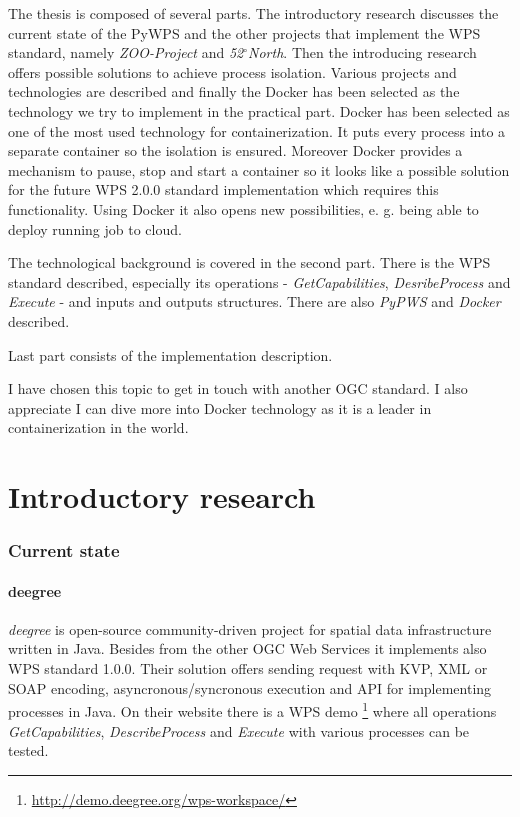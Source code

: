 \documentclass[12pt,a4paper]{article}
\begin{document}
The thesis is composed of several parts. The introductory research discusses the current state of the PyWPS and the
other projects that implement the WPS standard, namely \textit{ZOO-Project} and \textit{52$^{\circ}$North}. Then the
introducing research offers possible solutions to achieve process isolation. Various projects and technologies are
described and finally the Docker has been selected as the technology we try to implement in the practical part. Docker
has been selected as one of the most used technology for containerization. It puts every process into a separate
container so the isolation is ensured. Moreover Docker provides a mechanism to pause, stop and start a container so it
looks like a possible solution for the future WPS 2.0.0 standard implementation which requires this functionality. Using
Docker it also opens new possibilities, e. g. being able to deploy running job to cloud.

The technological background is covered in the second part. There is the WPS standard described, especially its operations
- \textit{GetCapabilities}, \textit{DesribeProcess} and \textit{Execute} - and inputs and outputs structures. There are also
\textit{PyPWS} and \textit{Docker} described.

Last part consists of the implementation description.

I have chosen this topic to get in touch with another OGC standard. I also appreciate I can dive more into Docker technology
as it is a leader in containerization in the world.

\newpage
\part{Introductory research}

\newpage
\section{Current state}
\subsection{deegree}
\textit{deegree} is open-source community-driven project for spatial data infrastructure written in Java. Besides from the other OGC Web Services it implements also WPS standard 1.0.0. Their solution offers sending request with KVP, XML or SOAP encoding, asyncronous/syncronous execution and API for implementing processes in Java. On their website there is a WPS demo
\footnote{\url{http://demo.deegree.org/wps-workspace/}} where all operations \textit{GetCapabilities}, \textit{DescribeProcess} and \textit{Execute} with various processes can be tested.
\end{document}
